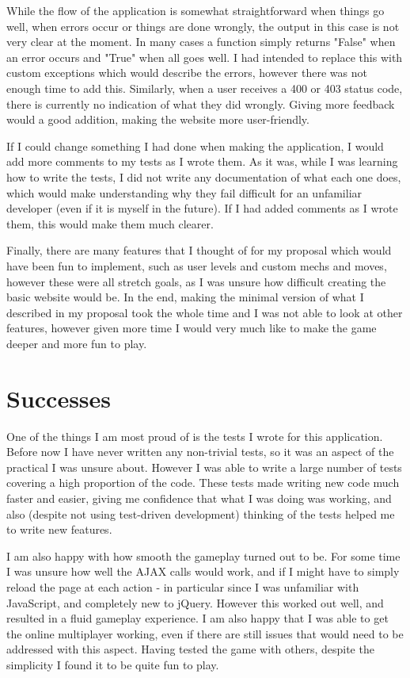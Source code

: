 \documentclass{article}
\begin{document}
While the flow of the application is somewhat straightforward when things go well, when errors occur or things are done wrongly, the output in this case is not very clear at the moment. In many cases a function simply returns "False" when an error occurs and "True" when all goes well. I had intended to replace this with custom exceptions which would describe the errors, however there was not enough time to add this. Similarly, when a user receives a 400 or 403 status code, there is currently no indication of what they did wrongly. Giving more feedback would a good addition, making the website more user-friendly.

If I could change something I had done when making the application, I would add more comments to my tests as I wrote them. As it was, while I was learning how to write the tests, I did not write any documentation of what each one does, which would make understanding why they fail difficult for an unfamiliar developer (even if it is myself in the future). If I had added comments as I wrote them, this would make them much clearer.

Finally, there are many features that I thought of for my proposal which would have been fun to implement, such as user levels and custom mechs and moves, however these were all stretch goals, as I was unsure how difficult creating the basic website would be. In the end, making the minimal version of what I described in my proposal took the whole time and I was not able to look at other features, however given more time I would very much like to make the game deeper and more fun to play.

\section{Successes}

One of the things I am most proud of is the tests I wrote for this application. Before now I have never written any non-trivial tests, so it was an aspect of the practical I was unsure about. However I was able to write a large number of tests covering a high proportion of the code. These tests made writing new code much faster and easier, giving me confidence that what I was doing was working, and also (despite not using test-driven development) thinking of the tests helped me to write new features.

I am also happy with how smooth the gameplay turned out to be. For some time I was unsure how well the AJAX calls would work, and if I might have to simply reload the page at each action - in particular since I was unfamiliar with JavaScript, and completely new to jQuery. However this worked out well, and resulted in a fluid gameplay experience. I am also happy that I was able to get the online multiplayer working, even if there are still issues that would need to be addressed with this aspect. Having tested the game with others, despite the simplicity I found it to be quite fun to play.
\end{document}
